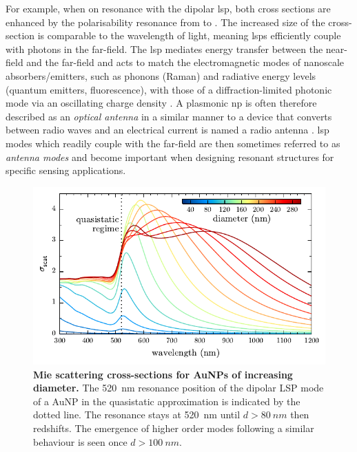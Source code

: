 \documentclass{article}
\begin{document}
For example, when on resonance with the dipolar \gls{lsp}, both cross sections are enhanced by the polarisability resonance from  to . The increased size of the cross-section is comparable to the wavelength of light, meaning \glspl{lsp} efficiently couple with photons in the far-field. The \gls{lsp} mediates energy transfer between the near-field and the far-field and acts to match the electromagnetic modes of nanoscale absorbers/emitters, such as phonons (Raman) and radiative energy levels (quantum emitters, fluorescence), with those of a diffraction-limited photonic mode via an oscillating charge density \cite{berweger2012}. A plasmonic \gls{np} is often therefore described as an \textit{optical antenna} in a similar manner to a device that converts between radio waves and an electrical current is named a radio antenna \cite{bharadwaj2009, novotny2011}. \Gls{lsp} modes which readily couple with the far-field are then sometimes referred to as \emph{antenna modes} and become important when designing resonant structures for specific sensing applications.

\begin{figure}[bt]
\centering
\includegraphics{figures/mie_scattering}
\caption[Mie scattering cross-sections for AuNPs of increasing diameter]{\textbf{Mie scattering cross-sections for AuNPs of increasing diameter.} The \SI{520}{nm} resonance position of the dipolar LSP mode of a AuNP in the quasistatic approximation is indicated by the dotted line. The resonance stays at \SI{520}{nm} until $d>\SI{80}{nm}$ then redshifts. The emergence of higher order modes following a similar behaviour is seen once $d>\SI{100}{nm}$.}
\label{fig:mie_scattering}
\end{figure}
\end{document}
